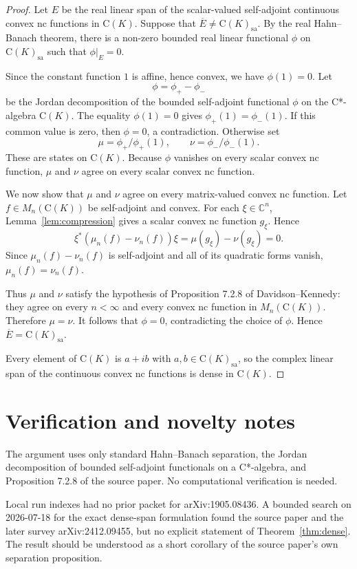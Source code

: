 \documentclass[11pt]{article}
\newcommand{\CK}{\mathrm{C}(K)}
\newcommand{\Mn}{M_n}
\newcommand{\sa}{\mathrm{sa}}
\begin{document}
\begin{proof}
Let \(E\) be the real linear span of the scalar-valued self-adjoint continuous
convex nc functions in \(\CK\).  Suppose that \(\overline{E}\ne \CK_{\sa}\).
By the real Hahn--Banach theorem, there is a non-zero bounded real linear
functional \(\phi\) on \(\CK_{\sa}\) such that \(\phi|_E=0\).

Since the constant function \(1\) is affine, hence convex, we have
\(\phi(1)=0\).  Let
\[
\phi=\phi_+-\phi_-
\]
be the Jordan decomposition of the bounded self-adjoint functional \(\phi\) on
the C*-algebra \(\CK\).  The equality \(\phi(1)=0\) gives
\(\phi_+(1)=\phi_-(1)\).  If this common value is zero, then
\(\phi=0\), a contradiction.  Otherwise set
\[
\mu=\phi_+/\phi_+(1),\qquad \nu=\phi_-/\phi_-(1).
\]
These are states on \(\CK\).  Because \(\phi\) vanishes on every scalar convex
nc function, \(\mu\) and \(\nu\) agree on every scalar convex nc function.

We now show that \(\mu\) and \(\nu\) agree on every matrix-valued convex nc
function.  Let \(f\in \Mn(\CK)\) be self-adjoint and convex.  For each
\(\xi\in\mathbb{C}^n\), Lemma~\ref{lem:compression} gives a scalar convex nc
function \(g_\xi\).  Hence
\[
\xi^*(\mu_n(f)-\nu_n(f))\xi
=\mu(g_\xi)-\nu(g_\xi)=0 .
\]
Since \(\mu_n(f)-\nu_n(f)\) is self-adjoint and all of its quadratic forms
vanish, \(\mu_n(f)=\nu_n(f)\).

Thus \(\mu\) and \(\nu\) satisfy the hypothesis of Proposition 7.2.8 of
Davidson--Kennedy: they agree on every \(n<\infty\) and every convex nc
function in \(\Mn(\CK)\).  Therefore \(\mu=\nu\).  It follows that
\(\phi=0\), contradicting the choice of \(\phi\).  Hence
\(\overline{E}=\CK_{\sa}\).

Every element of \(\CK\) is \(a+ib\) with \(a,b\in\CK_{\sa}\), so the complex
linear span of the continuous convex nc functions is dense in \(\CK\).
\end{proof}

\section{Verification and novelty notes}

The argument uses only standard Hahn--Banach separation, the Jordan
decomposition of bounded self-adjoint functionals on a C*-algebra, and
Proposition 7.2.8 of the source paper.  No computational verification is
needed.

Local run indexes had no prior packet for arXiv:1905.08436.  A bounded search
on 2026-07-18 for the exact dense-span formulation found the source paper and
the later survey arXiv:2412.09455, but no explicit statement of
Theorem~\ref{thm:dense}.  The result should be understood as a short corollary
of the source paper's own separation proposition.
\end{document}
